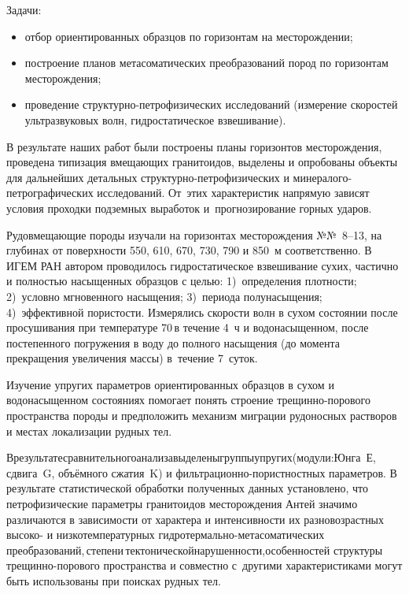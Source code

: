 Задачи:
\begin{itemize}[noitemsep]\vspace{-8pt}
  \item отбор ориентированных образцов по горизонтам на месторождении;
  \item построение планов метасоматических преобразований пород по горизонтам месторождения;
  \item проведение структурно-петрофизических исследований (измерение скоростей ультразвуковых волн, гидростатическое взвешивание).
\end{itemize}
 \vspace{-8pt}

В результате наших работ были построены планы горизонтов месторождения, проведена типизация вмещающих гранитоидов, выделены и опробованы объекты для дальнейших детальных структурно-петрофизических и минералого-петрографических исследований. От~этих характеристик напрямую зависят условия проходки подземных выработок и~прогнозирование горных ударов.

Рудовмещающие породы изучали на горизонтах месторождения №№~8--13, на глубинах от поверхности 550, 610, 670, 730, 790 и 850~м соответственно. В ИГЕМ РАН автором проводилось гидростатическое взвешивание сухих, частично и полностью насыщенных образцов с целью: 1)~определения плотности; 2)~условно мгновенного насыщения; 3)~периода полунасыщения; 4)~эффективной пористости.
Измерялись скорости волн в сухом состоянии после просушивания при температуре 70\,\dgc в течение 4~ч и водонасыщенном, после постепенного погружения в воду до полного насыщения (до момента прекращения увеличения массы) в~течение 7~суток.

Изучение упругих параметров ориентированных образцов в сухом и водонасыщенном состояниях помогает понять строение трещинно-порового пространства породы и предположить механизм миграции рудоносных растворов и местах локализации рудных тел.

В\;\;результате\;\;сравнительного\;\;анализа\;\;выделены\;\;группы\;\;упругих\;\;(модули:\;\;Юнга~Е, сдвига~G, объёмного сжатия~K) и фильтрационно-пористностных параметров. В результате статистической обработки полученных данных установлено, что петрофизические параметры гранитоидов месторождения Антей значимо различаются в зависимости от характера и интенсивности их разновозрастных высоко- и низкотемпературных гидротермально-метасоматических\;\;\,преобразований,\;\;\,степени\;\;\,тектонической\;\;нарушенности,\;\;особенностей структуры трещинно-порового пространства и совместно с~другими характеристиками могут быть использованы при поисках рудных тел.

